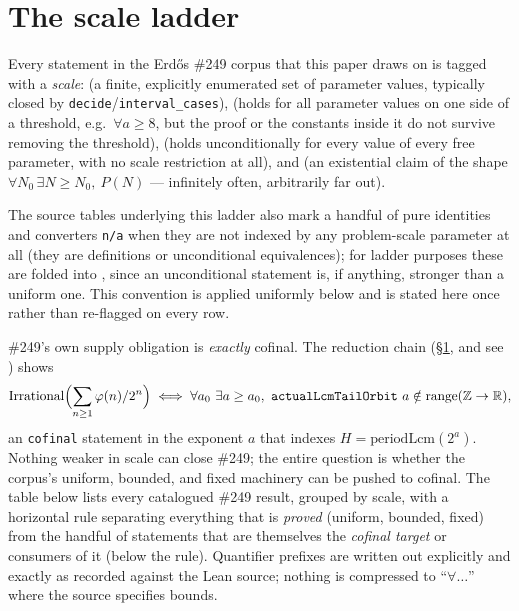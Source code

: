 \section{The scale ladder}\label{sec:249-scale-ladder}

Every statement in the Erd\H{o}s \#249 corpus that this paper draws on is tagged with a
\emph{scale}:  (a finite, explicitly enumerated set of parameter values, typically
closed by \texttt{decide}/\texttt{interval\_cases}),  (holds for all parameter
values on one side of a threshold, e.g.\ $\forall a\ge 8$, but the proof or the constants inside
it do not survive removing the threshold),  (holds unconditionally for every value
of every free parameter, with no scale restriction at all), and  (an existential
claim of the shape $\forall N_0\,\exists N\ge N_0,\ P(N)$ — infinitely often, arbitrarily far out).

The source tables underlying this ladder also mark a handful of pure identities and converters
\texttt{n/a} when they are not indexed by any problem-scale parameter at all (they are definitions
or unconditional equivalences); for ladder purposes these are folded into , since an
unconditional statement is, if anything, stronger than a uniform one. This convention is applied
uniformly below and is stated here once rather than re-flagged on every row.

\#249's own supply obligation is \emph{exactly} cofinal. The reduction chain
(\S\ref{sec:249-scale-ladder}, and see )
shows
\[
  \mathrm{Irrational}\Bigl(\sum_{n\ge 1}\varphi(n)/2^n\Bigr) \iff \forall a_0\ \exists a\ge a_0,\ \texttt{actualLcmTailOrbit}\ a \notin \mathrm{range}(\mathbb{Z}\to\mathbb{R}),
\]
an \texttt{cofinal} statement in the exponent $a$ that indexes $H=\mathrm{periodLcm}(2^a)$. Nothing
weaker in scale can close \#249; the entire question is whether the corpus's uniform, bounded, and
fixed machinery can be pushed to cofinal. The table below lists every catalogued \#249 result,
grouped by scale, with a horizontal rule separating everything that is \emph{proved} (uniform,
bounded, fixed) from the handful of statements that are themselves the \emph{cofinal target} or
consumers of it (below the rule). Quantifier prefixes are written out explicitly and exactly as
recorded against the Lean source; nothing is compressed to ``$\forall\dots$'' where the source
specifies bounds.

